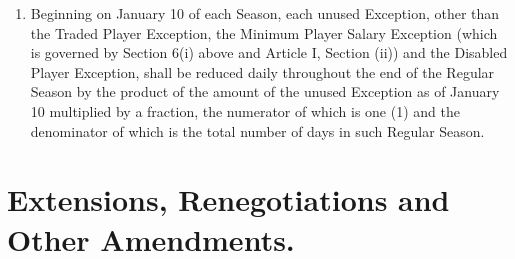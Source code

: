 \documentclass[
]{book}
\begin{document}
\begin{enumerate}
\begin{enumerate}
  \item
    Beginning on January 10 of each Season, each unused Exception, other than the Traded Player Exception, the Minimum Player Salary Exception (which is governed by Section 6(i) above and Article I, Section (ii)) and the Disabled Player Exception, shall be reduced daily throughout the end of the Regular Season by the product of the amount of the unused Exception as of January 10 multiplied by a fraction, the numerator of which is one (1) and the denominator of which is the total number of days in such Regular Season.
  \end{enumerate}
\end{enumerate}

\hypertarget{extensions-renegotiations-and-other-amendments.}{%
\section{Extensions, Renegotiations and Other Amendments.}\label{extensions-renegotiations-and-other-amendments.}}
\end{document}
